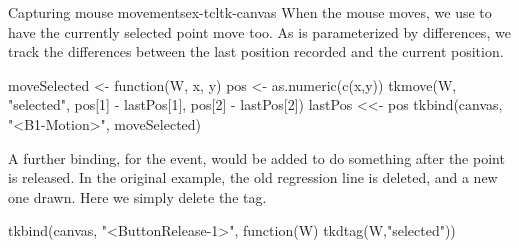 \begin{example}{Capturing mouse movements}{ex-tcltk-canvas}
When the mouse moves, we use  to have the currently
selected point move too. As  is parameterized by
differences, we track the differences
between the last position recorded and the current position.
\begin{Schunk}
\begin{Sinput}
 moveSelected <- function(W, x, y) {
   pos <- as.numeric(c(x,y))
   tkmove(W, "selected", pos[1] - lastPos[1], 
                         pos[2] - lastPos[2])
   lastPos <<- pos
 }
 tkbind(canvas, "<B1-Motion>", moveSelected)
\end{Sinput}
\end{Schunk}
%
A further binding, for the  event, would be
added to do something after the point is released. In the original
example, the old regression line is deleted, and a new one drawn. Here
we simply delete the  tag.
\begin{Schunk}
\begin{Sinput}
 tkbind(canvas, "<ButtonRelease-1>", 
        function(W) tkdtag(W,"selected"))
\end{Sinput}
\end{Schunk}


\end{example}





